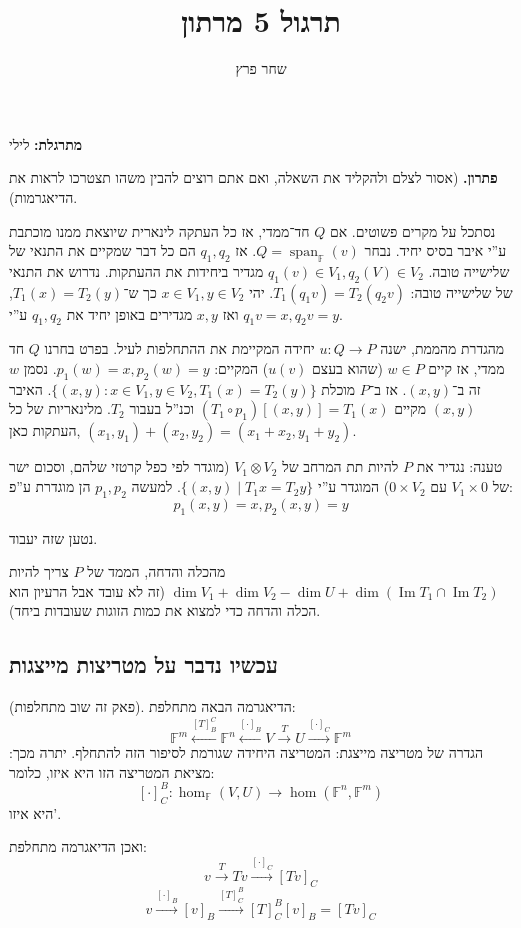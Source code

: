 \documentclass[]{article}
\author{שחר פרץ}
\title{תרגול 5 מרתון}
\DeclareMathOperator\Img   {Im}
\DeclareMathOperator{\Sp}     {span}
\newcommand\F         {\mathbb{F}}
\newcommand\co        {\colon}
\theoremstyle{definition}
\begin{document}
	\maketitle
	\textbf{מתרגלת: }לילי
	
	\textbf{פתרון. }(אסור לצלם ולהקליד את השאלה, ואם אתם רוצים להבין משהו תצטרכו לראות את הדיאגרמות). 
	
	נסתכל על מקרים פשוטים. אם $Q$ חד־ממדי, אז כל העתקה לינארית שיוצאת ממנו מוכתבת ע''י איבר בסיס יחיד. נבחר $Q = \Sp_\F(v)$. אז $q_1, q_2$ הם כל דבר שמקיים את התנאי של שלישייה טובה. $q_1(v) \in V_1, q_2(V) \in V_2$ מגדיר ביחידות את ההעתקות. נדרוש את התנאי של שלישייה טובה: $T_1(q_1v) = T_2(q_2v)$. יהי $x \in V_1, y \in V_2$ כך ש־$T_1(x) = T_2(y)$, ואז $x, y$ מגדירים באופן יחיד את $q_1, q_2$ ע''י $q_1v = x, q_2v = y$. 
	
	מהגדרת מהממת, ישנה $u \co Q \to P$ יחידה המקיימת את ההתחלפות לעיל. בפרט בחרנו $Q$ חד ממדי, אז קיים $w \in P$ (שהוא בעצם $u(v)$) המקיים: $p_1(w) = x, p_2(w) = y$. נסמן $w$ זה ב־$(x, y)$. אז ב־$P$ מוכלת $\{(x, y) \co x \in V_1  , y \in V_2, T_1(x) = T_2(y)\}$. האיבר $(x, y)$ מקיים $(T_1 \circ p_1)[(x, y)] = T_1(x)$ וכנ''ל בעבור $T_2$. מלינאריות של כל העתקות כאן, $(x_1, y_1) + (x_2, y_2) = (x_1 + x_2, y_1 + y_2)$. 
	
	טענה: נגדיר את $P$ להיות תת המרחב של $V_1 \otimes V_2$ (מוגדר לפי כפל קרטזי שלהם, וסכום ישר של $V_1 \times 0$ עם $0 \times V_2$) המוגדר ע''י $\{(x, y) \mid T_1x = T_2y\}$. למעשה $p_1, p_2$ הן מוגדרת ע''פ: 
	\[ p_1(x, y) = x, p_2(x, y) = y \]
	
	נטען שזה יעבוד. 
	
	מהכלה והדחה, הממד של $P$ צריך להיות $\dim V_1 + \dim V_2 - \dim U + \dim (\Img T_1 \cap \Img T_2)$ (זה לא עובד אבל הרעיון הוא הכלה והדחה כדי למצוא את כמות הזוגות שעובדות ביחד). 
	
	\subsection*{עכשיו נדבר על מטריצות מייצגות}
	(פאק זה שוב מתחלפות). הדיאגרמה הבאה מתחלפת: 
	\[ \F^m\overset{[T]_B^C}{\leftarrow}\F^n \overset{[\cdot]_B}{\leftarrow }V \overset{T}{\to}U \overset{[\cdot ]_C}{\to} \F^m \]
	הגדרה של מטריצה מייצגת: המטריצה היחידה שגורמת לסיפור הזה להתחלף. יתרה מכך: מציאת המטריצה הזו היא איזו, כלומר: 
	\[ [\cdot]_C^B \co \hom_\F(V, U) \to \hom(\F^n, \F^m) \]
	היא איזו'. 
	
	ואכן הדיאגרמה מתחלפת: 
	\[ v \overset{T}{\to} Tv \overset{[\cdot]_C}{\to} [Tv]_C \]
	\[ v \overset{[\cdot]_B}{\to} [v]_B \overset{[T]^B_C}{\to}[T]^B_C[v]_B = [Tv]_C \]
	
\end{document}
